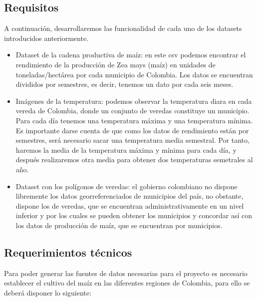 \documentclass[12pt, spanish]{article}
\begin{document}
\newpage

\subsection{Requisitos}

A continuación, desarrollaremos las funcionalidad de cada uno de los datasets introducidos anteriormente.

\begin{itemize}
    \item Dataset de la cadena productiva de maíz: en este csv podemos encontrar el rendimiento de la producción de Zea mays (maíz) en unidades de toneladas/hectárea por cada municipio de Colombia. Los datos se encuentran divididos por semestres, es decir, tenemos un dato por cada seis meses.
    
    \item Imágenes de la temperatura: podemos observar la temperatura diara en cada vereda de Colombia, donde un conjunto de veredas constituye un municipio. Para cada día tenemos una temperatura máxima y una temperatura mínima. Es importante darse cuenta de que como los datos de rendimiento están por semestres, será necesario sacar una temperatura media semestral. Por tanto, haremos la media de la temperatura máxima y mínima para cada día, y después realizaremos otra media para obtener dos temperaturas semetrales al año.
    
    \item Dataset con los polígonos de veredas: el gobierno colombiano no dispone libremente los datos georreferenciados de municipios del país, no obstante, dispone los de veredas, que se encuentran administrativamente en un nivel inferior y por los cuales se pueden obtener los municipios y concordar así con los datos de producción de maíz, que se encuentran por municipios.
\end{itemize}


\subsection{Requerimientos técnicos}
Para poder generar las fuentes de datos necesarias para el proyecto es necesario establecer el cultivo del maíz en las diferentes regiones de Colombia, para ello se deberá disponer lo siguiente:
\end{document}
